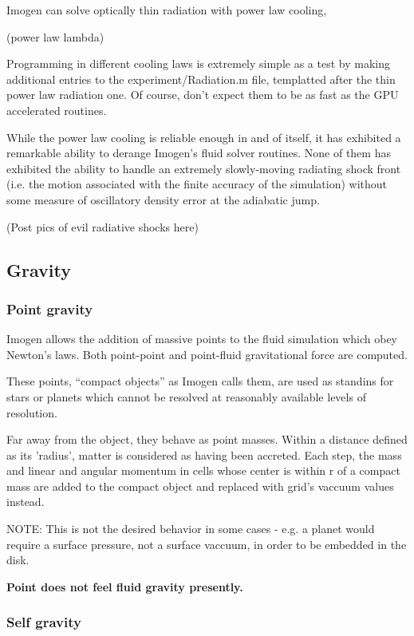 \documentclass[letterpaper,12pt,twocolumn]{article}
\begin{document}
Imogen can solve optically thin radiation with power law cooling,

(power law lambda)

Programming in different cooling laws is extremely simple as a test by making additional
entries to the experiment/Radiation.m file, templatted after the thin power law radiation
one. Of course, don't expect them to be as fast as the GPU accelerated routines.

While the power law cooling is reliable enough in and of itself, it has exhibited a
remarkable ability to derange Imogen's fluid solver routines. None of them has exhibited
the ability to handle an extremely slowly-moving radiating shock front (i.e. the motion
associated with the finite accuracy of the simulation) without some measure of oscillatory
density error at the adiabatic jump.

(Post pics of evil radiative shocks here)

\subsection{Gravity}

\subsubsection{Point gravity}

Imogen allows the addition of massive points to the fluid simulation which obey Newton's
laws. Both point-point and point-fluid gravitational force are computed.

These points, ``compact objects'' as Imogen calls them, are used as standins for stars
or planets which cannot be resolved at reasonably available levels of resolution.

Far away from the object, they behave as point masses. Within a distance defined as
its 'radius', matter is considered as having been accreted. Each step, the mass and
linear and angular momentum in cells whose center is within r of a compact mass
are added to the compact object and replaced with grid's vaccuum values instead.

NOTE: This is not the desired behavior in some cases - e.g. a planet would require a surface
pressure, not a surface vaccuum, in order to be embedded in the disk.

\textbf{Point does not feel fluid gravity presently.}

\subsubsection{Self gravity}
\end{document}
